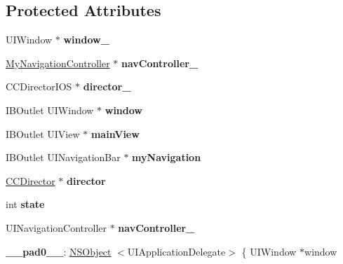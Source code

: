 \subsection*{Protected Attributes}
\begin{DoxyCompactItemize}
\item 
\hypertarget{interface_app_controller_a7d049e3a3da649292de1abd63c43b248}{U\-I\-Window $\ast$ {\bfseries window\-\_\-}}\label{interface_app_controller_a7d049e3a3da649292de1abd63c43b248}

\item 
\hypertarget{interface_app_controller_a9d0e9361ac3f7b823b01d40ffcf3b81b}{\hyperlink{interface_my_navigation_controller}{My\-Navigation\-Controller} $\ast$ {\bfseries nav\-Controller\-\_\-}}\label{interface_app_controller_a9d0e9361ac3f7b823b01d40ffcf3b81b}

\item 
\hypertarget{interface_app_controller_a6df31e78ee33bfab9feab7fd14c146ac}{C\-C\-Director\-I\-O\-S $\ast$ {\bfseries director\-\_\-}}\label{interface_app_controller_a6df31e78ee33bfab9feab7fd14c146ac}

\item 
\hypertarget{interface_app_controller_ac8913259a2206b06b7846241ed1bf040}{I\-B\-Outlet U\-I\-Window $\ast$ {\bfseries window}}\label{interface_app_controller_ac8913259a2206b06b7846241ed1bf040}

\item 
\hypertarget{interface_app_controller_a80c57e6bf779777381def5e439e6e693}{I\-B\-Outlet U\-I\-View $\ast$ {\bfseries main\-View}}\label{interface_app_controller_a80c57e6bf779777381def5e439e6e693}

\item 
\hypertarget{interface_app_controller_a80163f91f16978843cbb04e9845e67c2}{I\-B\-Outlet U\-I\-Navigation\-Bar $\ast$ {\bfseries my\-Navigation}}\label{interface_app_controller_a80163f91f16978843cbb04e9845e67c2}

\item 
\hypertarget{interface_app_controller_ac50e2bc99744723b27711ede1de2afd2}{\hyperlink{class_c_c_director}{C\-C\-Director} $\ast$ {\bfseries director}}\label{interface_app_controller_ac50e2bc99744723b27711ede1de2afd2}

\item 
\hypertarget{interface_app_controller_a62a50057127e98c5c0ace30cb811a25a}{int {\bfseries state}}\label{interface_app_controller_a62a50057127e98c5c0ace30cb811a25a}

\item 
\hypertarget{interface_app_controller_a17b79ebde0d994b3f56afe99a386e636}{U\-I\-Navigation\-Controller $\ast$ {\bfseries nav\-Controller\-\_\-}}\label{interface_app_controller_a17b79ebde0d994b3f56afe99a386e636}

\item 
\hypertarget{interface_app_controller_afe9ab307bfbb98958673e432543ea26f}{{\bfseries \-\_\-\-\_\-pad0\-\_\-\-\_\-}\-: \hyperlink{class_n_s_object}{N\-S\-Object} $<$U\-I\-Application\-Delegate$>$ \{ U\-I\-Window $\ast$window}\label{interface_app_controller_afe9ab307bfbb98958673e432543ea26f}

\end{DoxyCompactItemize}
